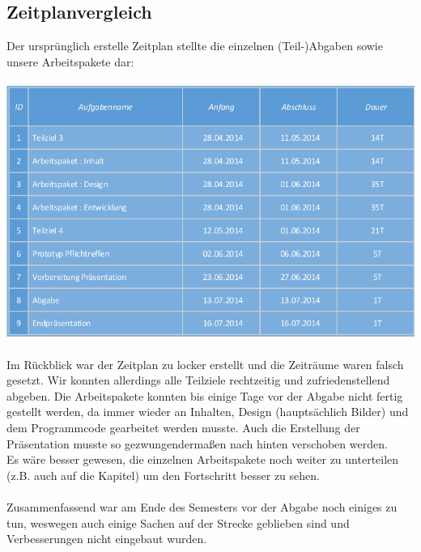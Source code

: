 \documentclass[a4paper]{article}
\begin{document}
    \subsection{Zeitplanvergleich}
        Der ursprünglich erstelle Zeitplan stellte die einzelnen (Teil-)Abgaben sowie unsere Arbeitspakete dar:\\\\
        \includegraphics[width=\linewidth]{zeitplan_1}\\\\
        Im Rückblick war der Zeitplan zu locker erstellt und die Zeiträume waren falsch gesetzt. Wir konnten allerdings alle Teilziele rechtzeitig und zufriedenstellend abgeben. Die Arbeitspakete konnten bis einige Tage vor der Abgabe nicht fertig gestellt werden, da immer wieder an Inhalten, Design (hauptsächlich Bilder) und dem Programmcode gearbeitet werden musste. Auch die Erstellung der Präsentation musste so gezwungendermaßen nach hinten verschoben werden.\\
        Es wäre besser gewesen, die einzelnen Arbeitspakete noch weiter zu unterteilen (z.B. auch auf die Kapitel) um den Fortschritt besser zu sehen.\\
        \\
        Zusammenfassend war am Ende des Semesters vor der Abgabe noch einiges zu tun, weswegen auch einige Sachen auf der Strecke geblieben sind und Verbesserungen nicht eingebaut wurden.

\end{document}
